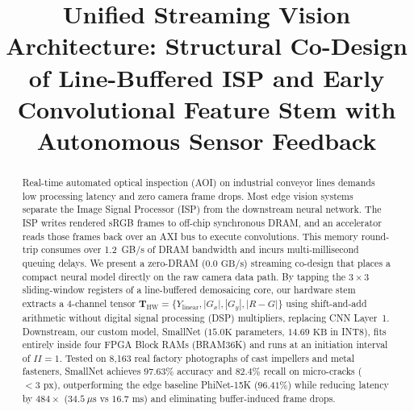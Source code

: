 \documentclass[conference]{IEEEtran}
\begin{document}
\title{Unified Streaming Vision Architecture: Structural Co-Design of Line-Buffered ISP and Early Convolutional Feature Stem with Autonomous Sensor Feedback}

\author{
\and
{}
}

\maketitle

\begin{abstract}
Real-time automated optical inspection (AOI) on industrial conveyor lines demands low processing latency and zero camera frame drops. Most edge vision systems separate the Image Signal Processor (ISP) from the downstream neural network. The ISP writes rendered sRGB frames to off-chip synchronous DRAM, and an accelerator reads those frames back over an AXI bus to execute convolutions. This memory round-trip consumes over 1.2~GB/s of DRAM bandwidth and incurs multi-millisecond queuing delays. We present a zero-DRAM ($0.0\text{ GB/s}$) streaming co-design that places a compact neural model directly on the raw camera data path. By tapping the $3\times3$ sliding-window registers of a line-buffered demosaicing core, our hardware stem extracts a 4-channel tensor $\mathbf{T}_{\text{HW}} = \{Y_{\text{linear}}, |G_x|, |G_y|, |R-G|\}$ using shift-and-add arithmetic without digital signal processing (DSP) multipliers, replacing CNN Layer~1. Downstream, our custom model, SmallNet ($15.0\text{K}$ parameters, $14.69\text{ KB}$ in INT8), fits entirely inside four FPGA Block RAMs (BRAM36K) and runs at an initiation interval of $II=1$. Tested on 8,163 real factory photographs of cast impellers and metal fasteners, SmallNet achieves $97.63\%$ accuracy and $82.4\%$ recall on micro-cracks ($<3\text{ px}$), outperforming the edge baseline PhiNet-15K ($96.41\%$) while reducing latency by $484\times$ ($34.5\ \mu\text{s}$ vs $16.7\text{ ms}$) and eliminating buffer-induced frame drops.
\end{abstract}
\end{document}
